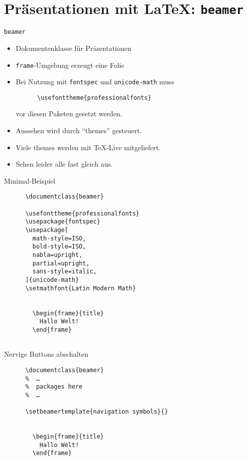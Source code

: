 \section{Präsentationen mit \LaTeX: \lstinline+beamer+}

\begin{frame}[fragile]{\lstinline+beamer+}
  \begin{itemize}
    \item Dokumentenklasse für Präsentationen
    \item \lstinline+frame+-Umgebung erzeugt eine Folie
    \item Bei Nutzung mit \lstinline+fontspec+ und \lstinline+unicode-math+ muss
      \begin{lstlisting}
      \usefonttheme{professionalfonts}
      \end{lstlisting}
      vor diesen Paketen gesetzt werden.
    \item Aussehen wird durch \enquote{themes} gesteuert.
    \item Viele themes werden mit \TeX-Live mitgeliefert.
    \item Sehen leider alle fast gleich aus.
  \end{itemize}
\end{frame}
\begin{frame}[fragile]{Minimal-Beispiel}
  \begin{center}
    \begin{lstlisting}
      \documentclass{beamer}

      \usefonttheme{professionalfonts}
      \usepackage{fontspec}
      \usepackage[
        math-style=ISO,
        bold-style=ISO,
        nabla=upright,
        partial=upright,
        sans-style=italic,
      ]{unicode-math}
      \setmathfont{Latin Modern Math}

      
        \begin{frame}{title}
          Hallo Welt!
        \end{frame}
      
    \end{lstlisting}
  \end{center}
\end{frame}

\begin{frame}[fragile]{Nervige Buttons abschalten}
  \begin{center}
    \begin{lstlisting}
      \documentclass{beamer}
      %  …
      %  packages here
      %  …

      \setbeamertemplate{navigation symbols}{}

      
        \begin{frame}{title}
          Hallo Welt!
        \end{frame}
      
    \end{lstlisting}
  \end{center}
\end{frame}

